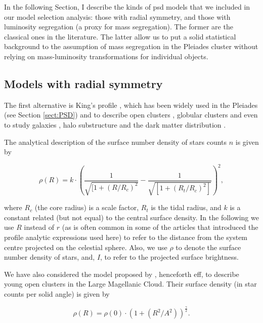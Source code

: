 In the following Section, I describe the kinds of \gls{psd} models that we included in our model selection analysis: those with radial symmetry, and those with luminosity segregation (a proxy for mass segregation). The former are the classical ones in the literature. The latter allow us to put a solid statistical background to the assumption of mass segregation in the Pleiades cluster \cite[see for example][]{2004A&A...426...75M, Converse2010} without relying on mass-luminosity transformations for individual objects. 

\subsection{Models with radial symmetry}
\label{sect:RadialModels}
The first alternative is King's profile \citep{King1962}, which has been widely used in the Pleiades (see Section \ref{sect:PSD}) and to describe open clusters
\citep[see][for recent applications]{2017MNRAS.469.1330A,2017MNRAS.468.2684P}, globular clusters \citep{2017ApJ...840L..25M} and even to study
galaxies \citep{2017MNRAS.466.1513R}, halo substructure \citep{2007ApJ...663..960S} and the dark matter distribution \citep{2016MNRAS.458.2848J}. 

The analytical description of the surface number density of stars counts $n$ is given by

\begin{equation}
  \rho(R) = k\cdot\left(\frac{1}{\sqrt{[1+(R/R_c)^2}}-\frac{1}{\sqrt{[1+(R_t/R_c)^2]}}\right)^2,
\end{equation}

where $R_c$ (the core radius) is a scale factor, $R_t$ is the tidal radius, and $k$ is a constant related (but not equal) to the central surface density. In the following we use $R$ instead of $r$ (as is often common in some of the articles that introduced the profile analytic expressions used here) to refer to the distance from the system centre projected on the celestial sphere. Also, we use $\rho$ to denote the surface number density of stars, and, $I$, to refer to the projected surface brightness.

We have also considered the model proposed by \cite{EFF1987}, henceforth \gls{eff}, to describe young open clusters in the Large Magellanic Cloud. Their surface density (in star counts per solid angle) is given by

\begin{equation}
\rho(R)=\rho(0)\cdot(1+(R^2/A^2))^\frac{\gamma}{2}.
\label{eq:eff}
\end{equation}

